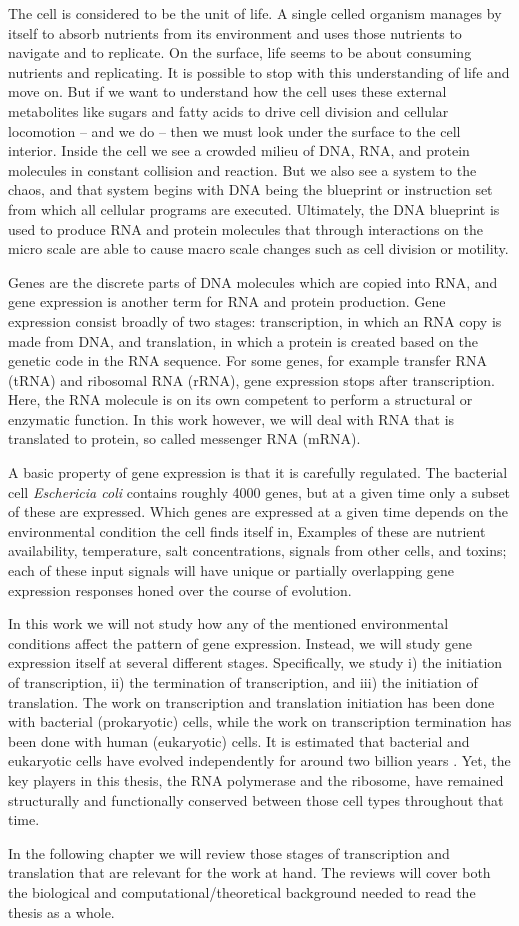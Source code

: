 %

The cell is considered to be the unit of life. A single celled organism manages
by itself to absorb nutrients from its environment and uses those nutrients to
navigate and to replicate. On the surface, life seems to be about
consuming nutrients and replicating. It is possible to stop with this
understanding of life and move on. But if we want to understand how the cell
uses these external metabolites like sugars and fatty acids to drive cell
division and cellular locomotion -- and we do -- then we must look under the
surface to the cell interior. Inside the cell we see a crowded milieu of DNA,
RNA, and protein molecules in constant collision and reaction. But we also see
a system to the chaos, and that system begins with DNA being the blueprint or
instruction set from which all cellular programs are executed. Ultimately, the
DNA blueprint is used to produce RNA and protein molecules that through
interactions on the micro scale are able to cause macro scale changes such as
cell division or motility.

Genes are the discrete parts of DNA molecules which are copied into RNA, and gene
expression is another term for RNA and protein production. Gene expression
consist broadly of two stages: transcription, in which an RNA copy is made
from DNA, and translation, in which a protein is created based on
the genetic code in the RNA sequence. For some genes, for example transfer RNA
(tRNA) and ribosomal RNA (rRNA), gene expression stops after transcription.
Here, the RNA molecule is on its own competent to perform a structural or
enzymatic function. In this work however, we will deal with RNA that is
translated to protein, so called messenger RNA (mRNA).

A basic property of gene expression is that it is carefully regulated. The
bacterial cell \textit{Eschericia coli} contains roughly 4000 genes, but at a
given time only a subset of these are expressed. Which genes are expressed at a
given time depends on the environmental condition the cell finds itself in,
Examples of these are nutrient availability, temperature, salt concentrations,
signals from other cells, and toxins; each of these input signals will have
unique or partially overlapping gene expression responses honed over the
course of evolution.

In this work we will not study how any of the mentioned environmental
conditions affect the pattern of gene expression. Instead, we will study gene
expression itself at several different stages. Specifically, we study i) the
initiation of transcription, ii) the termination of transcription, and iii) the
initiation of translation. The work on transcription and translation initiation
has been done with bacterial (prokaryotic) cells, while the work on
transcription termination has been done with human (eukaryotic) cells. It is
estimated that bacterial and eukaryotic cells have evolved independently for
around two billion years \cite{vellai_origin_1999}. Yet, the key players in
this thesis, the RNA polymerase and the ribosome, have remained structurally
and functionally conserved between those cell types throughout that time.

In the following chapter we will review those stages of transcription and
translation that are relevant for the work at hand. The reviews will cover both
the biological and computational/theoretical background needed to read the
thesis as a whole.
